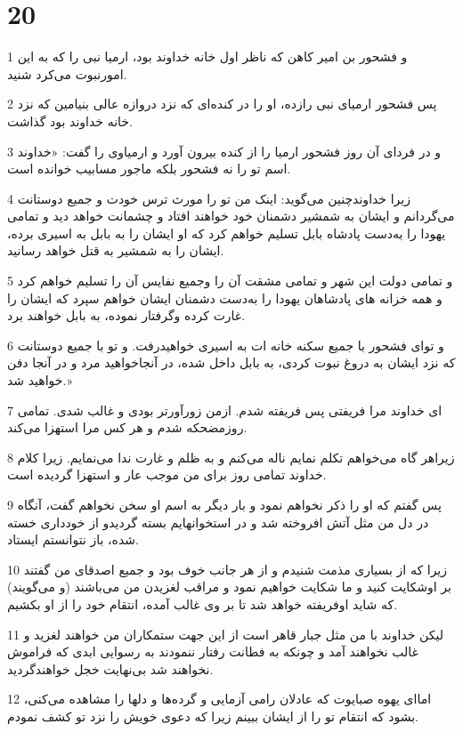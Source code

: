 \chapter{20}

\par 1 و فشحور بن امیر کاهن که ناظر اول خانه خداوند بود، ارمیا نبی را که به این امورنبوت می‌کرد شنید.
\par 2 پس فشحور ارمیای نبی رازده، او را در کنده‌ای که نزد دروازه عالی بنیامین که نزد خانه خداوند بود گذاشت.
\par 3 و در فردای آن روز فشحور ارمیا را از کنده بیرون آورد و ارمیاوی را گفت: «خداوند اسم تو را نه فشحور بلکه ماجور مسابیب خوانده است.
\par 4 زیرا خداوندچنین می‌گوید: اینک من تو را مورث ترس خودت و جمیع دوستانت می‌گردانم و ایشان به شمشیر دشمنان خود خواهند افتاد و چشمانت خواهد دید و تمامی یهودا را به‌دست پادشاه بابل تسلیم خواهم کرد که او ایشان را به بابل به اسیری برده، ایشان را به شمشیر به قتل خواهد رسانید.
\par 5 و تمامی دولت این شهر و تمامی مشقت آن را وجمیع نفایس آن را تسلیم خواهم کرد و همه خزانه های پادشاهان یهودا را به‌دست دشمنان ایشان خواهم سپرد که ایشان را غارت کرده وگرفتار نموده، به بابل خواهند برد.
\par 6 و تو‌ای فشحور با جمیع سکنه خانه ات به اسیری خواهیدرفت. و تو با جمیع دوستانت که نزد ایشان به دروغ نبوت کردی، به بابل داخل شده، در آنجاخواهید مرد و در آنجا دفن خواهید شد.»
\par 7 ‌ای خداوند مرا فریفتی پس فریفته شدم. ازمن زورآورتر بودی و غالب شدی. تمامی روزمضحکه شدم و هر کس مرا استهزا می‌کند.
\par 8 زیراهر گاه می‌خواهم تکلم نمایم ناله می‌کنم و به ظلم و غارت ندا می‌نمایم. زیرا کلام خداوند تمامی روز برای من موجب عار و استهزا گردیده است.
\par 9 پس گفتم که او را ذکر نخواهم نمود و بار دیگر به اسم او سخن نخواهم گفت، آنگاه در دل من مثل آتش افروخته شد و در استخوانهایم بسته گردیدو از خودداری خسته شده، باز نتوانستم ایستاد.
\par 10 زیرا که از بسیاری مذمت شنیدم و از هر جانب خوف بود و جمیع اصدقای من گفتند بر اوشکایت کنید و ما شکایت خواهیم نمود و مراقب لغزیدن من می‌باشند (و می‌گویند) که شاید اوفریفته خواهد شد تا بر وی غالب آمده، انتقام خود را از او بکشیم.
\par 11 لیکن خداوند با من مثل جبار قاهر است از این جهت ستمکاران من خواهند لغزید و غالب نخواهند آمد و چونکه به فطانت رفتار ننمودند به رسوایی ابدی که فراموش نخواهند شد بی‌نهایت خجل خواهندگردید.
\par 12 اما‌ای یهوه صبایوت که عادلان رامی آزمایی و گرده‌ها و دلها را مشاهده می‌کنی، بشود که انتقام تو را از ایشان ببینم زیرا که دعوی خویش را نزد تو کشف نمودم.
